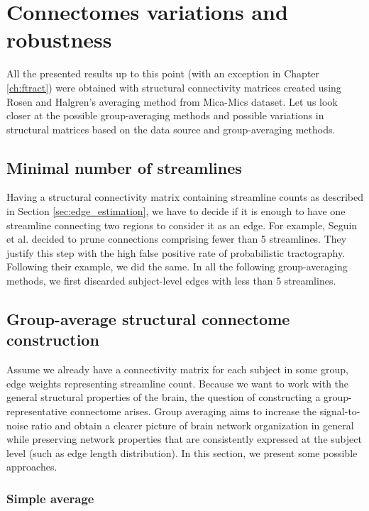 \chapter{Connectomes variations and  robustness}\label{ch:SC_indepth}

All the presented results up to this point (with an exception in Chapter \ref{ch:ftract}) were obtained with structural connectivity matrices created using Rosen and Halgren's averaging method from Mica-Mics dataset. Let us look closer at the possible group-averaging methods and possible variations in structural matrices based on the data source and group-averaging methods. 

\section{Minimal number of streamlines}

Having a structural connectivity matrix containing streamline counts as described in Section \ref{sec:edge_estimation}, we have to decide if it is enough to have one streamline connecting two regions to consider it as an edge. For example, Seguin et al. \cite{seguin_communication_2023} decided to prune connections comprising fewer than 5 streamlines. They justify this step with the high false positive rate of probabilistic tractography. Following their example, we did the same. In all the following group-averaging methods, we first discarded subject-level edges with less than 5 streamlines.

\section{Group-average structural connectome construction}\label{sec:group-avg}

Assume we already have a connectivity matrix for each subject in some group, edge weights representing streamline count. Because we want to work with the general structural properties of the brain, the question of constructing a group-representative connectome arises. Group averaging aims to increase the signal-to-noise ratio and obtain a clearer picture of brain network organization in general while preserving network properties that are consistently expressed at the subject level (such as edge length distribution). \cite{betzel_distance-dependent_2019} In this section, we present some possible approaches.

\subsection{Simple average}\label{sec:average}

